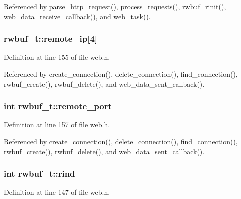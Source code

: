 Referenced by parse\-\_\-http\-\_\-request(), process\-\_\-requests(), rwbuf\-\_\-rinit(), web\-\_\-data\-\_\-receive\-\_\-callback(), and web\-\_\-task().

\hypertarget{structrwbuf__t_ad83926198e358ac1a569b0da7749572c}{
\subsubsection[{remote\-\_\-ip}]{ rwbuf\-\_\-t\-::remote\-\_\-ip\mbox{[}4\mbox{]}}}\label{structrwbuf__t_ad83926198e358ac1a569b0da7749572c}


Definition at line 155 of file web.\-h.



Referenced by create\-\_\-connection(), delete\-\_\-connection(), find\-\_\-connection(), rwbuf\-\_\-create(), rwbuf\-\_\-delete(), and web\-\_\-data\-\_\-sent\-\_\-callback().

\hypertarget{structrwbuf__t_aace1e79a985cc8fab4c2093208bf3763}{
\subsubsection[{remote\-\_\-port}]{\setlength{\rightskip}{0pt plus 5cm}int rwbuf\-\_\-t\-::remote\-\_\-port}}\label{structrwbuf__t_aace1e79a985cc8fab4c2093208bf3763}


Definition at line 157 of file web.\-h.



Referenced by create\-\_\-connection(), delete\-\_\-connection(), find\-\_\-connection(), rwbuf\-\_\-create(), rwbuf\-\_\-delete(), and web\-\_\-data\-\_\-sent\-\_\-callback().

\hypertarget{structrwbuf__t_ad5cbf7a78a5f5d9aa75b38f90e0fb6af}{
\subsubsection[{rind}]{\setlength{\rightskip}{0pt plus 5cm}int rwbuf\-\_\-t\-::rind}}\label{structrwbuf__t_ad5cbf7a78a5f5d9aa75b38f90e0fb6af}


Definition at line 147 of file web.\-h.



